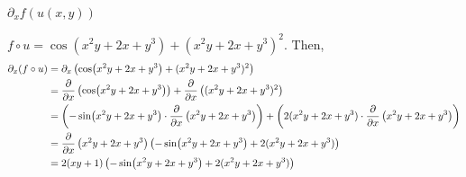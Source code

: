 $\partial_x f(u(x,y))$

\soln* $f \circ u = \cos(x^2 y + 2x + y^3) + (x^2y + 2x + y^3)^2$. Then,
\begin{align*}
    \partial_x (f \circ u) &= \partial_x \pars{\cos(x^2 y + 2x + y^3) + (x^2y + 2x + y^3)^2} \\
    &= \pdv{x} \pars{\cos(x^2 y + 2x + y^3)} + \pdv{x} \pars{(x^2y + 2x + y^3)^2}\\
    &= \pars{-\sin(x^2 y + 2x + y^3) \cdot \pdv{x} \pars{x^2 y + 2x + y^3}} + \pars{2(x^2y + 2x + y^3) \cdot \pdv{x} \pars{x^2 y + 2x + y^3}}\\
    &= \pdv{x} \pars{x^2 y + 2x + y^3} \pars{-\sin(x^2 y + 2x + y^3)+ 2(x^2y + 2x + y^3) }\\
    &= 2(xy + 1) \pars{-\sin(x^2 y + 2x + y^3)+ 2(x^2y + 2x + y^3) }
\end{align*}